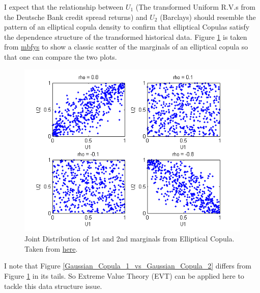 \documentclass{report}
\theoremstyle{plain}
\theoremstyle{definition}
\begin{document}
I expect that the relationship between $U_1$ (The transformed Uniform R.V.s from the Deutsche Bank credit spread returns) and $U_2$ (Barclays) should resemble the pattern of an elliptical copula density to confirm that elliptical Copulas satisfy the dependence structure of the transformed historical data. Figure \ref{copulademo_08} is taken from  \href{http://www.mbfys.ru.nl/~robvdw/CNP04/LAB_ASSIGMENTS/LAB05_CN05/MATLAB2007b/stats/html/copulademo.html}{mbfys} to show a classic scatter of the marginals of an elliptical copula so that one can compare the two plots.

\begin{figure}[H]
	\begin{center}
		\includegraphics[width=15cm]{copulademo_08.png}
		\caption{Joint Distribution of 1st and 2nd marginals from Elliptical Copula. \newline Taken from \href{http://www.mbfys.ru.nl/~robvdw/CNP04/LAB_ASSIGMENTS/LAB05_CN05/MATLAB2007b/stats/html/copulademo.html}{here}.} 
		\label{copulademo_08}
	\end{center}
\end{figure}

I note that Figure \ref{Gaussian_Copula_1_vs_Gaussian_Copula_2} differs from Figure \ref{copulademo_08} in its tails. So Extreme Value Theory (EVT) can be applied here to tackle this data structure issue.
\end{document}
